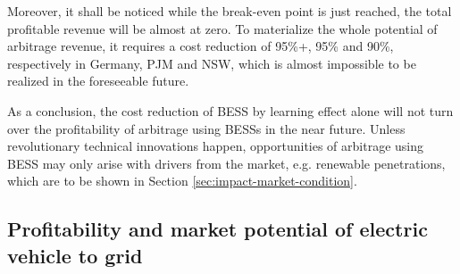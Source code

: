 Moreover, it shall be noticed while the break-even point is just reached, the total profitable revenue will be almost at zero. To materialize the whole potential of arbitrage revenue, it requires a cost reduction of 95\%+, 95\% and 90\%, respectively in Germany, PJM and NSW, which is almost impossible to be realized in the foreseeable future.

As a conclusion, the cost reduction of BESS by learning effect alone will not turn over the profitability of arbitrage using BESSs in the near future. Unless revolutionary technical innovations happen, opportunities of arbitrage using BESS may only arise with drivers from the market, e.g. renewable penetrations, which are to be shown in Section \ref{sec:impact-market-condition}.
\subsection[Profitability and market potential of electric vehicle to grid]{Profitability and market potential of electric vehicle to grid%
	}

